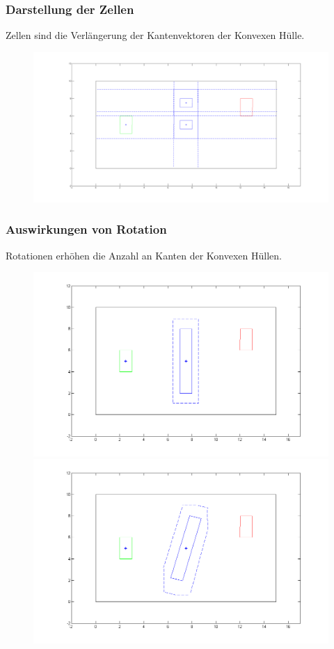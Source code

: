 \documentclass[final]{beamer}
\begin{document}
\begin{frame}
\frametitle{Darstellung der Zellen}
Zellen sind die Verlängerung der Kantenvektoren der Konvexen Hülle.\\
\begin{figure}
\centering
\includegraphics[scale=0.1]{../thesis/riddle2HullCell}
\end{figure}
\end{frame}

\begin{frame}
\frametitle{Auswirkungen von Rotation}
Rotationen erhöhen die Anzahl an Kanten der Konvexen Hüllen.
\begin{figure}
\centering
\includegraphics[scale=0.2]{../thesis/rotHull}
\includegraphics[scale=0.2]{../thesis/rotatedHull}
\end{figure}
\end{frame}
\end{document}
